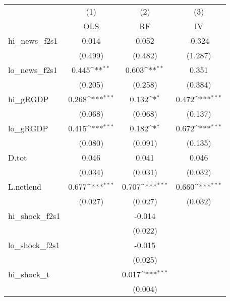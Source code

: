 {
\def\sym#1{\ifmmode^{#1}\else\(^{#1}\)\fi}
\begin{tabular}{l*{3}{c}}
\toprule
            &\multicolumn{1}{c}{(1)}&\multicolumn{1}{c}{(2)}&\multicolumn{1}{c}{(3)}\\
            &\multicolumn{1}{c}{OLS}&\multicolumn{1}{c}{RF}&\multicolumn{1}{c}{IV}\\
\midrule
hi\_news\_f2s1&       0.014         &       0.052         &      -0.324         \\
            &     (0.499)         &     (0.482)         &     (1.287)         \\
\addlinespace
lo\_news\_f2s1&       0.445\sym{**} &       0.603\sym{**} &       0.351         \\
            &     (0.205)         &     (0.258)         &     (0.384)         \\
\addlinespace
hi\_gRGDP    &       0.268\sym{***}&       0.132\sym{*}  &       0.472\sym{***}\\
            &     (0.068)         &     (0.068)         &     (0.137)         \\
\addlinespace
lo\_gRGDP    &       0.415\sym{***}&       0.182\sym{*}  &       0.672\sym{***}\\
            &     (0.080)         &     (0.091)         &     (0.135)         \\
\addlinespace
D.tot       &       0.046         &       0.041         &       0.046         \\
            &     (0.034)         &     (0.031)         &     (0.032)         \\
\addlinespace
L.netlend   &       0.677\sym{***}&       0.707\sym{***}&       0.660\sym{***}\\
            &     (0.027)         &     (0.027)         &     (0.032)         \\
\addlinespace
hi\_shock\_f2s1&                     &      -0.014         &                     \\
            &                     &     (0.022)         &                     \\
\addlinespace
lo\_shock\_f2s1&                     &      -0.015         &                     \\
            &                     &     (0.025)         &                     \\
\addlinespace
hi\_shock\_t  &                     &       0.017\sym{***}&                     \\
            &                     &     (0.004)         &                     \\

\end{tabular}}
